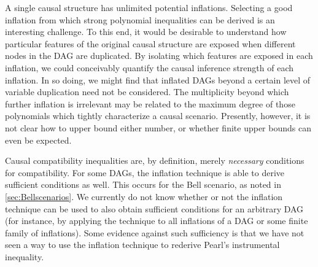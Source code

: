 A single causal structure has unlimited potential inflations. Selecting a good inflation from which strong polynomial inequalities can be derived is an interesting challenge. To this end, it would be desirable to understand how particular features of the original causal structure are exposed when different nodes in the DAG are duplicated. By isolating which features are exposed in each inflation, we could conceivably quantify the causal inference strength of each inflation. In so doing, we might find that inflated DAGs beyond a certain level of variable duplication need not be considered. The multiplicity beyond which further inflation is irrelevant may be related to the maximum degree of those polynomials which tightly characterize a causal scenario. Presently, however, it is not clear how to upper bound either number, or whether finite upper bounds can even be expected.


Causal compatibility inequalities are, by definition, merely {\em necessary} conditions for compatibility.  For some DAGs, the inflation technique is able to derive sufficient conditions as well.  This occurs for the Bell scenario, as noted in \cref{sec:Bellscenarios}.  We currently do not know whether or not the inflation technique can be used to also obtain sufficient conditions for an arbitrary DAG (for instance, by applying the technique to all inflations of a DAG or some finite family of inflations).
Some evidence against such sufficiency is that we have not seen a way to use the inflation technique to rederive Pearl's instrumental inequality.



